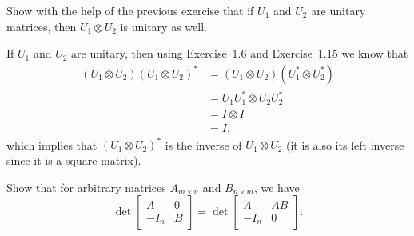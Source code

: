 Show with the help of the previous exercise that if \(U_1\) and \(U_2\) are unitary matrices, then \(U_1 \otimes U_2\) is unitary as well.

\begin{solution}
  If $U_1$ and $U_2$ are unitary, then using Exercise~1.6 and Exercise~1.15 we know that
  \begin{align*}
    (U_1 \otimes U_2) (U_1 \otimes U_2)^*
    & = (U_1 \otimes U_2) (U_1^* \otimes U_2^*)\\
    & = U_1U_1^* \otimes U_2U_2^*\\
    & = I \otimes I\\
    & = I,
  \end{align*}
  which implies that $(U_1 \otimes U_2)^*$
  is the inverse of $U_1 \otimes U_2$
  (it is also its left inverse since it is a square matrix).
\end{solution}

Show that for arbitrary matrices \(A_{m \times n}\) and \(B_{n \times m}\), we have
\[
\det\begin{bmatrix}
A & 0\\
-I_n & B
\end{bmatrix} =
\det\begin{bmatrix}
A & AB\\
-I_n & 0
\end{bmatrix}.
\]

